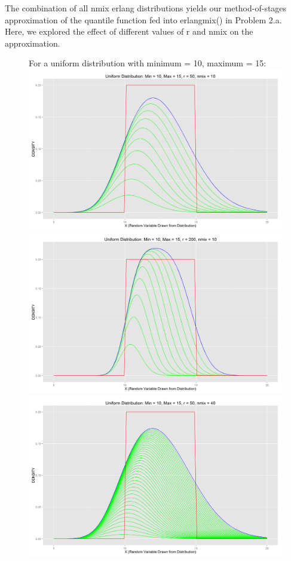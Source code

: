 \documentclass[letter]{article}
\begin{document}
The combination of all nmix erlang distributions yields our method-of-stages approximation of the quantile function fed into erlangmix() in Problem 2.a.\\

Here, we explored the effect of different values of r and nmix on the approximation.\\

\begin{figure}[H]
\centering
\Large{For a uniform distribution with minimum = 10, maximum = 15:}\\
\includegraphics[scale=.27]{figures/unifdist_10_15_50_10.png}
\includegraphics[scale=.27]{figures/unifdist_10_15_200_10.png}\\
\includegraphics[scale=.27]{figures/unifdist_10_15_50_40.png}

\end{figure}
\end{document}

